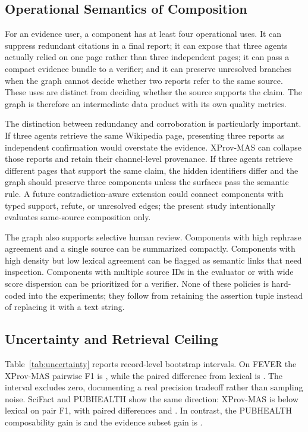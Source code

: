 \documentclass{ieeeaccess}
\begin{document}
\subsection{Operational Semantics of Composition}
For an evidence user, a component has at least four operational uses. It can suppress redundant citations in a final report; it can expose that three agents actually relied on one page rather than three independent pages; it can pass a compact evidence bundle to a verifier; and it can preserve unresolved branches when the graph cannot decide whether two reports refer to the same source. These uses are distinct from deciding whether the source supports the claim. The graph is therefore an intermediate data product with its own quality metrics.

The distinction between redundancy and corroboration is particularly important. If three agents retrieve the same Wikipedia page, presenting three reports as independent confirmation would overstate the evidence. XProv-MAS can collapse those reports and retain their channel-level provenance. If three agents retrieve different pages that support the same claim, the hidden identifiers differ and the graph should preserve three components unless the surfaces pass the semantic rule. A future contradiction-aware extension could connect components with typed support, refute, or unresolved edges; the present study intentionally evaluates same-source composition only.

The graph also supports selective human review. Components with high rephrase agreement and a single source can be summarized compactly. Components with high density but low lexical agreement can be flagged as semantic links that need inspection. Components with multiple source IDs in the evaluator or with wide score dispersion can be prioritized for a verifier. None of these policies is hard-coded into the experiments; they follow from retaining the assertion tuple instead of replacing it with a text string.

\subsection{Uncertainty and Retrieval Ceiling}
Table~\ref{tab:uncertainty} reports record-level bootstrap intervals. On FEVER the XProv-MAS pairwise F1 is \FEVERXProvFOneCI, while the paired difference from lexical is \FEVERXProvPairFOneDelta. The interval excludes zero, documenting a real precision tradeoff rather than sampling noise. SciFact and PUBHEALTH show the same direction: XProv-MAS is below lexical on pair F1, with paired differences \SciFactXProvPairFOneDelta and \PubHealthXProvPairFOneDelta. In contrast, the PUBHEALTH composability gain is \PubHealthXProvComposableDelta and the evidence subset gain is \PubHealthEvidenceXProvComposableDelta.
\end{document}
